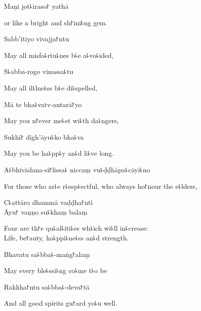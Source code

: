 Maṇi jot꜕iraso꜓ yathā

\begin{english}
  or like a bright and sh꜓ini꜕ng gem.
\end{english}

Sabb'ītiyo vivajja꜓ntu

\begin{english}
  May all misfo꜕rtu꜕nes b꜕e a꜕vo꜕ided,
\end{english}

S꜕abba-rogo vinassa꜕tu

\begin{english}
  May all il꜕lne꜕ss b꜕e di꜕spelled,
\end{english}

Mā te bha꜕vatv-antarā꜓yo

\begin{english}
  May you n꜓ever me꜕et wi꜕th da꜕ngers,
\end{english}

Sukhī꜓ dīgh'āyu꜕ko bha꜕va

\begin{english}
  May you be ha꜕pp꜕y an꜕d li꜕ve long.
\end{english}

A꜕bhivādana-sī꜓lissa꜕ niccaṃ vu꜕ḍḍhāpa꜕cāyi꜕no\\

\begin{english}
  For those who ar꜕e r꜕esp꜕ectful, who always ho꜓nour the e꜕lders,
\end{english}

C꜕attāro dhammā vaḍḍha꜓nti\\
Āyu꜓ vaṇṇo su꜕khaṃ balaṃ

\begin{english}
  Four are th꜓e qu꜕al꜕iti꜕es wh꜕ich wi꜕ll in꜕crease:\\
  Life, be꜓auty, ha꜕ppi꜕ne꜕ss an꜕d strength.
\end{english}

Bhavatu sa꜕bba꜕-maṅg꜓alaṃ

\begin{english}
  May every ble꜕ssi꜕ng co꜕me t꜕o be
\end{english}

Rakkha꜓ntu sa꜕bba꜕-deva꜓tā

\begin{english}
  And all good spirits gu꜓ard yo꜕u well.
\end{english}

